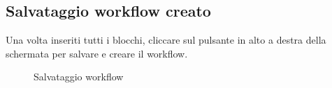 \subsection{Salvataggio workflow creato} \label{saveWorkflow}
Una volta inseriti tutti i blocchi, cliccare sul pulsante in alto a destra della schermata per salvare e creare il workflow. \\
	\begin{figure}[!ht]
		\centering
		\caption{Salvataggio workflow}
	\end{figure}
